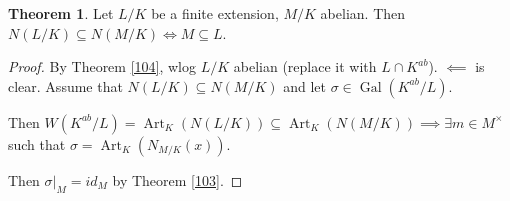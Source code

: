 \documentclass[a4paper]{article}
\theoremstyle{definition}
\theoremstyle{default}
\newtheorem{theorem}[definition]{Theorem}
\theoremstyle{remark}
\DeclareMathOperator{\Gal}{Gal}
\DeclareMathOperator{\Art}{Art}
\begin{document}
\begin{theorem}
	Let $L/K$ be a finite extension, $M/K$ abelian.
	Then $N(L/K) \subseteq N(M/K) \iff M \subseteq L$.
\end{theorem}
\begin{proof}
	By Theorem \ref{104}, wlog $L/K$ abelian (replace it with $L\cap K^{ab}$).
	$\impliedby$ is clear. Assume that $N(L/K) \subseteq N(M/K)$ and let $\sigma \in \Gal(K^{ab}/L)$.
	
	Then $W(K^{ab}/L) = \Art_K(N(L/K)) \subseteq \Art_K(N(M/K)) \implies \exists m \in M^\times$ such that $\sigma = \Art_K(N_{M/K}(x))$.
	
	Then $\sigma|_M = id_M$ by Theorem \ref{103}.
\end{proof}
\end{document}

